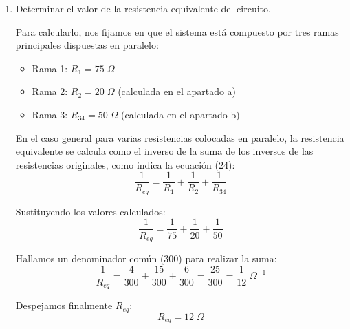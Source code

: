 \documentclass[11pt, a4paper]{article}
\newenvironment{problem}[1][Cuestión]{
		\vspace{0.5cm}
		\noindent{\Large\bfseries #1} \par\vspace{0.5cm}
}{
		\vspace{0.5cm}
}
\begin{document}
\begin{problem}[Cuestión 1]
\begin{enumerate}[label=\alph*)]
{					Para hallar la corriente $I_4$, aplicamos la ley de Ohm descrita en la ecuación (5) del libro:
					$$I_4 = \frac{V_1}{R_{34}}$$

					Sustituyendo los valores:
					$$\boxed{I_4 = \frac{10 \text{ V}}{50 \; \Omega} = 0,2 \text{ A}}$$
				}

			\item Determinar el valor de la resistencia equivalente del circuito.

				{ \color{blue} 
					Para calcularlo, nos fijamos en que el sistema está compuesto por tres ramas principales dispuestas en paralelo:
					\begin{itemize}
						\item Rama 1: $R_1 = 75 \; \Omega$
						\item Rama 2: $R_2 = 20 \; \Omega$ (calculada en el apartado a)
						\item Rama 3: $R_{34} = 50 \; \Omega$ (calculada en el apartado b)
					\end{itemize}

					En el caso general para varias resistencias colocadas en paralelo, la resistencia equivalente se calcula como el inverso de la suma de los inversos de las resistencias originales, como indica la ecuación (24):
					$$\frac{1}{R_{eq}} = \frac{1}{R_1} + \frac{1}{R_2} + \frac{1}{R_{34}}$$

					Sustituyendo los valores calculados:
					$$\frac{1}{R_{eq}} = \frac{1}{75} + \frac{1}{20} + \frac{1}{50}$$

					Hallamos un denominador común (300) para realizar la suma:
					$$\frac{1}{R_{eq}} = \frac{4}{300} + \frac{15}{300} + \frac{6}{300} = \frac{25}{300} = \frac{1}{12} \; \Omega^{-1}$$

					Despejamos finalmente $R_{eq}$:
					$$\boxed{R_{eq} = 12 \; \Omega}$$
				}
		\end{enumerate}
	\end{problem}
\end{document}
